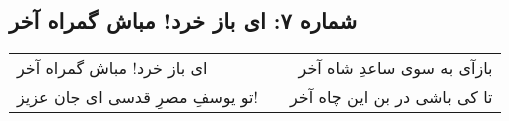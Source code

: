 \begin{center}
\section*{شماره ۷: ای باز خرد! مباش گمراه آخر}
\label{sec:007}
\begin{longtable}{l p{0.5cm} r}
ای باز خرد! مباش گمراه آخر
&&
بازآی به سوی ساعدِ شاه آخر
\\
تو یوسفِ مصرِ قدسی ای جان عزیز!
&&
تا کی باشی در بن این چاه آخر
\\
\end{longtable}
\end{center}
